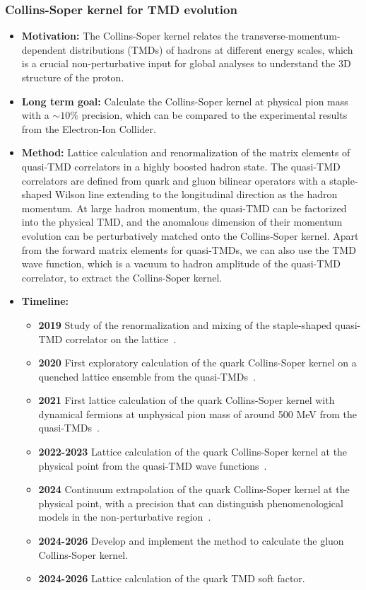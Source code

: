 \documentclass[12pt,hyperpdf]{article}
\begin{document}
\subsubsection{Collins-Soper kernel for TMD evolution}
\begin{itemize}
    \item{\bf Motivation:} The Collins-Soper kernel relates the
      transverse-momentum-dependent distributions (TMDs) of hadrons at
      different energy scales, which is a crucial non-perturbative
      input for global analyses to understand the 3D structure of the
      proton.
    \item{\bf Long term goal:} Calculate the Collins-Soper kernel at
      physical pion mass with a $\sim 10\%$ precision, which can be
      compared to the experimental results from the Electron-Ion
      Collider.
    \item{\bf Method:} Lattice calculation and renormalization of the
      matrix elements of quasi-TMD correlators in a highly boosted
      hadron state. The quasi-TMD correlators are defined from quark
      and gluon bilinear operators with a staple-shaped Wilson line
      extending to the longitudinal direction as the hadron
      momentum. At large hadron momentum, the quasi-TMD can be
      factorized into the physical TMD, and the anomalous dimension of
      their momentum evolution can be perturbatively matched onto the
      Collins-Soper kernel. Apart from the forward matrix elements for
      quasi-TMDs, we can also use the TMD wave function, which is a
      vacuum to hadron amplitude of the quasi-TMD correlator, to
      extract the Collins-Soper kernel.
\item{\bf Timeline:}
\begin{itemize}
    \item{\bf 2019} Study of the renormalization and mixing of the
      staple-shaped quasi-TMD correlator on the
      lattice~\cite{Shanahan:2019zcq}.
    \item{\bf 2020} First exploratory calculation of the quark
      Collins-Soper kernel on a quenched lattice ensemble from the
      quasi-TMDs~\cite{Shanahan:2020zxr}.
    \item{\bf 2021} First lattice calculation of the quark Collins-Soper
      kernel with dynamical fermions at unphysical pion mass of around
      500 MeV from the quasi-TMDs~\cite{Shanahan:2021tst}.
    \item{\bf 2022-2023} Lattice calculation of the quark
      Collins-Soper kernel at the physical point from the quasi-TMD
      wave functions~\cite{Avkhadiev:2023poz}.
    \item{\bf 2024} Continuum extrapolation of the quark Collins-Soper kernel at the physical point, with a precision that can distinguish phenomenological models in the non-perturbative region~\cite{Avkhadiev:2024mgd}.
    \item{\bf 2024-2026} Develop and implement the method to calculate the gluon Collins-Soper kernel.
    \item{\bf 2024-2026} Lattice calculation of the quark TMD soft factor.
\end{itemize}
\end{itemize}
\end{document}
